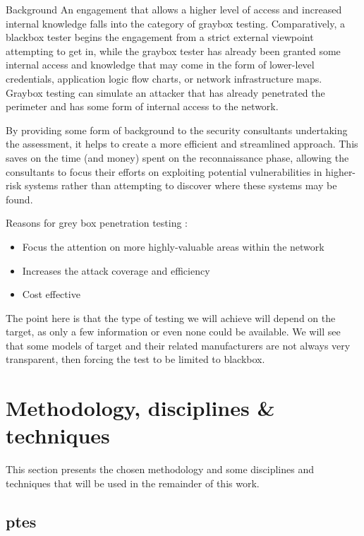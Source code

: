 \begin{chaptercover}{Background}
An engagement that allows a higher level of access and increased internal knowledge falls into the category of graybox testing. Comparatively, a blackbox tester begins the engagement from a strict external viewpoint attempting to get in, while the graybox tester has already been granted some internal access and knowledge that may come in the form of lower-level credentials, application logic flow charts, or network infrastructure maps. Graybox testing can simulate an attacker that has already penetrated the perimeter and has some form of internal access to the network.

By providing some form of background to the security consultants undertaking the assessment, it helps to create a more efficient and streamlined approach. This saves on the time (and money) spent on the reconnaissance phase, allowing the consultants to focus their efforts on exploiting potential vulnerabilities in higher-risk systems rather than attempting to discover where these systems may be found.

Reasons for grey box penetration testing :
\begin{itemize} \vspace{-.2cm}
  \item[\checkmark] Focus the attention on more highly-valuable areas within the network
  \item[\checkmark] Increases the attack coverage and efficiency
  \item[\checkmark] Cost effective
\end{itemize}

\begin{tip} \hyphenation{}
The point here is that the type of testing we will achieve will depend on the target, as only a few information or even none could be available. We will see that some models of target and their related manufacturers are not always very transparent, then forcing the test to be limited to blackbox.
\end{tip}

\section{Methodology, disciplines \& techniques}

This section presents the chosen methodology and some disciplines and techniques that will be used in the remainder of this work.

\subsection{\acrlong{ptes}}


\end{chaptercover}
